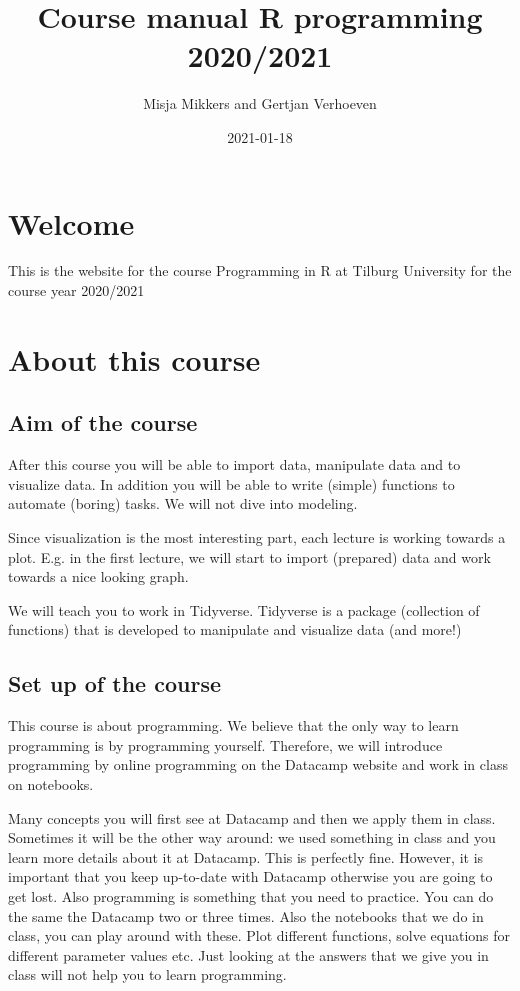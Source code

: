 \documentclass[
]{book}
\title{Course manual R programming 2020/2021}
\author{Misja Mikkers and Gertjan Verhoeven}
\date{2021-01-18}
\begin{document}
\maketitle

{
\setcounter{tocdepth}{1}
\tableofcontents
}
\hypertarget{welcome}{%
\chapter*{Welcome}\label{welcome}}

This is the website for the course Programming in R at Tilburg University for the course year 2020/2021

\hypertarget{about-this-course}{%
\chapter{About this course}\label{about-this-course}}

\hypertarget{aim-of-the-course}{%
\section{Aim of the course}\label{aim-of-the-course}}

After this course you will be able to import data, manipulate data and to visualize data. In addition you will be able to write (simple) functions to automate (boring) tasks. We will not dive into modeling.

Since visualization is the most interesting part, each lecture is working towards a plot. E.g. in the first lecture, we will start to import (prepared) data and work towards a nice looking graph.

We will teach you to work in Tidyverse. Tidyverse is a package (collection of functions) that is developed to manipulate and visualize data (and more!)

\hypertarget{set-up-of-the-course}{%
\section{Set up of the course}\label{set-up-of-the-course}}

This course is about programming. We believe that the only way to learn programming is by programming yourself. Therefore, we will introduce programming by online programming on the Datacamp website and work in class on notebooks.

Many concepts you will first see at Datacamp and then we apply them in class. Sometimes it will be the other way around: we used something in class and you learn more details about it at Datacamp. This is perfectly fine. However, it is important that you keep up-to-date with Datacamp otherwise you are going to get lost. Also programming is something that you need to practice. You can do the same the Datacamp two or three times. Also the notebooks that we do in class, you can play around with these. Plot different functions, solve equations for different parameter values etc. Just looking at the answers that we give you in class will not help you to learn programming.
\end{document}
